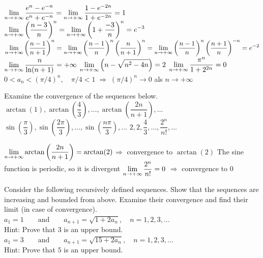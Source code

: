 \begin{Answer}

    \Question $\displaystyle\lim_{n \to +\infty} \dfrac{e^n - e^{-n}}{e^n + e^{-n}} = \displaystyle\lim_{n \to +\infty} \dfrac{1 - e^{-2n}}{1+ e^{-2n}} = 1$ 
    \Question $\displaystyle\lim_{n \to +\infty} \left(\dfrac{n-3}{n}\right)^n = \displaystyle\lim_{n \to +\infty} \left(1+\dfrac{-3}{n}\right)^n = e^{-3}$  
    \Question $\displaystyle\lim_{n \to +\infty}\left(\dfrac{n-1}{n+1}\right)^n = \displaystyle\lim_{n \to +\infty} \left(\dfrac{n-1}{n}\right)^n \left(\dfrac{n}{n+1}\right)^n = \displaystyle\lim_{n \to +\infty} \left(\dfrac{n-1}{n}\right)^n \left(\dfrac{n+1}{n}\right)^{-n} = e^{-2}$ 
    \Question $\displaystyle\lim_{n \to +\infty} \dfrac{n}{\ln(n+1)} = + \infty$
    \Question $\displaystyle\lim_{n \to +\infty}  \left(n - \sqrt{n^2-4n} \right) = 2$ 
    \Question $\displaystyle\lim_{n \to +\infty} \dfrac{\pi^n}{1+2^{2n}} = 0$ \qquad $0<a_n<(\pi/4)^n, \quad \pi/4 < 1 \; \Rightarrow \; (\pi/4)^n \rightarrow 0$ als $n \rightarrow + \infty$
    
\end{Answer}

\begin{Exercise} Examine the convergence of the sequences below. 
\Question[difficulty = 2] $\arctan \left(1\right), \arctan \left(\dfrac{4}{3}\right), \ldots, \arctan \left(\dfrac{2n}{n+1}\right), \ldots$
\Question[difficulty = 1] $\sin\left(\dfrac{\pi}{3} \right), \sin\left(\dfrac{2\pi}{3}\right), \ldots, \sin\left(\dfrac{n\pi}{3}\right), \ldots$
\Question[difficulty = 2] $2, 2, \dfrac{4}{3}, \ldots, \dfrac{2^n}{n!}, \ldots$ 
\end{Exercise}

\begin{Answer}

    \Question $\displaystyle\lim_{n \to +\infty} \arctan \left(\dfrac{2n}{n+1}\right)= \arctan (2)$\quad  $\Rightarrow$ convergence to $\arctan (2)$
    \Question The sine function is periodic, so it is divergent 
    \Question $\displaystyle\lim_{n \to +\infty} \dfrac{2^n}{n!} = 0$  \quad  $\Rightarrow$ convergence to 0
    
\end{Answer}


\begin{Exercise}[difficulty = 3] Consider the following recursively defined sequences. Show that the sequences are increasing and bounded from above. Examine their convergence and find their limit (in case of convergence).
    \Question $ a_1=1\qquad \mbox{and}\qquad a_{n+1}=\sqrt{1+2a_{n}},\quad n=1,2,3,\ldots$ \\[0.2cm]
     Hint: Prove that $3$ is an upper bound.
    \Question $a_1=3\qquad \mbox{and}\qquad a_{n+1}=\sqrt{15+2a_{n}},\quad n=1,2,3,\ldots$ \\[0.2cm]
     Hint: Prove that $5$ is an upper bound. 
\end{Exercise}

